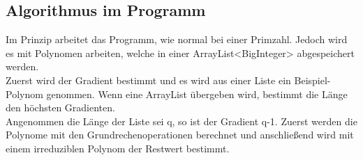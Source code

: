 \subsection*{Algorithmus im Programm}

Im Prinzip arbeitet das Programm, wie normal bei einer Primzahl. Jedoch wird es mit Polynomen arbeiten, welche in einer ArrayList<BigInteger> abgespeichert werden.\\
Zuerst wird der Gradient bestimmt und es wird aus einer Liste ein Beispiel-Polynom genommen. Wenn eine ArrayList übergeben wird, bestimmt die Länge den höchsten Gradienten.\\
Angenommen die Länge der Liste sei q, so ist der Gradient q-1. Zuerst werden die Polynome mit den Grundrechenoperationen berechnet und anschließend wird mit einem irreduziblen Polynom der Restwert bestimmt.
\\

